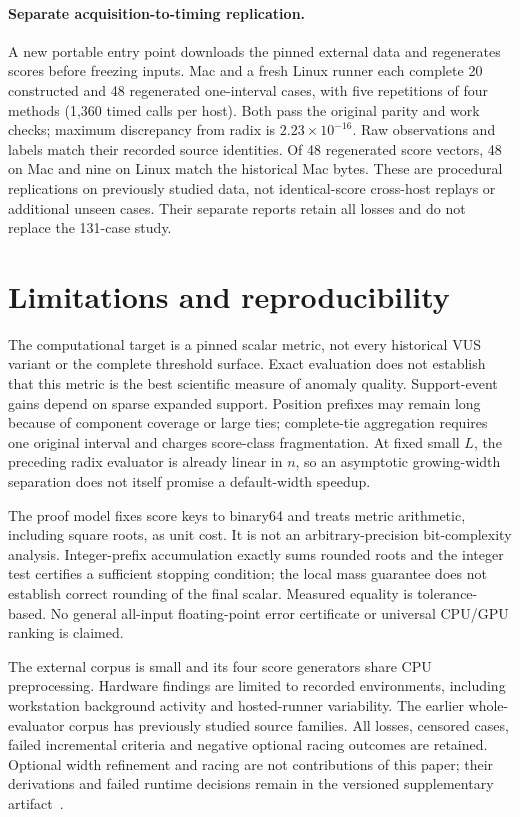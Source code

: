

\paragraph{Separate acquisition-to-timing replication.}
A new portable entry point downloads the pinned external data and regenerates
scores before freezing inputs. Mac and a fresh Linux runner each complete
20 constructed and 48 regenerated one-interval cases, with five repetitions
of four methods (1,360 timed calls per host). Both pass the original parity
and work checks; maximum discrepancy from radix is $2.23\times10^{-16}$.
Raw observations and labels match their recorded source identities. Of 48
regenerated score vectors, 48 on Mac and nine on Linux match the historical
Mac bytes. These are procedural replications on previously studied data,
not identical-score cross-host replays or additional unseen cases. Their
separate reports retain all losses and do not replace the 131-case study.

\section{Limitations and reproducibility}
The computational target is a pinned scalar metric, not every historical
VUS variant or the complete threshold surface. Exact evaluation does not
establish that this metric is the best scientific measure of anomaly
quality. Support-event gains depend on sparse expanded support. Position
prefixes may remain long because of component coverage or large ties;
complete-tie aggregation requires one original interval and charges score-class
fragmentation. At fixed small $L$, the preceding radix evaluator is already
linear in $n$, so an asymptotic growing-width separation does not itself
promise a default-width speedup.

The proof model fixes score keys to binary64 and treats metric arithmetic,
including square roots, as unit cost. It is not an arbitrary-precision
bit-complexity analysis. Integer-prefix accumulation exactly sums rounded
roots and the integer test certifies a sufficient stopping condition; the
local mass guarantee does not establish correct rounding of the final scalar.
Measured equality is tolerance-based. No general all-input floating-point
error certificate or universal CPU/GPU ranking is claimed.

The external corpus is small and its four score generators share CPU
preprocessing. Hardware findings are limited to recorded environments,
including workstation background activity and hosted-runner variability.
The earlier whole-evaluator corpus has previously studied source families.
All losses, censored cases, failed incremental criteria and negative optional
racing outcomes are retained. Optional width refinement and racing are not
contributions of this paper; their derivations and failed runtime decisions
remain in the versioned supplementary artifact~\cite{sparsevus03}.


